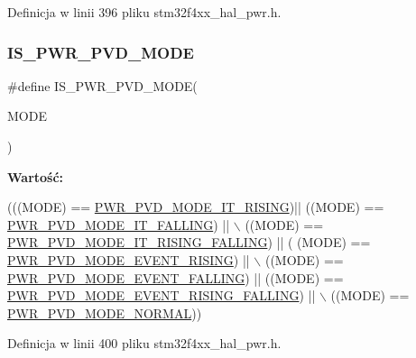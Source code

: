 Definicja w linii 396 pliku stm32f4xx\+\_\+hal\+\_\+pwr.\+h.

\mbox{\label{group___p_w_r___i_s___p_w_r___definitions_ga8edfbbba20e58a9281408c23dc6ff7ef}} 
\subsubsection{\texorpdfstring{I\+S\+\_\+\+P\+W\+R\+\_\+\+P\+V\+D\+\_\+\+M\+O\+DE}{IS\_PWR\_PVD\_MODE}}
{\footnotesize\ttfamily \#define I\+S\+\_\+\+P\+W\+R\+\_\+\+P\+V\+D\+\_\+\+M\+O\+DE(\begin{DoxyParamCaption}\item[{}]{M\+O\+DE }\end{DoxyParamCaption})}

{\bfseries Wartość\+:}
\begin{DoxyCode}
(((MODE) == \hyperlink{group___p_w_r___p_v_d___mode_ga102d7b8354419990a2a780f61cd020a6}{PWR\_PVD\_MODE\_IT\_RISING})|| ((MODE) == 
      \hyperlink{group___p_w_r___p_v_d___mode_gab600a54f3a588de836cfe4b727ab8a53}{PWR\_PVD\_MODE\_IT\_FALLING}) || \(\backslash\)
                              ((MODE) == \hyperlink{group___p_w_r___p_v_d___mode_gac531fbf14457e6595505354fad521b67}{PWR\_PVD\_MODE\_IT\_RISING\_FALLING}) || (
      (MODE) == \hyperlink{group___p_w_r___p_v_d___mode_ga1a946b01887aa886de329a92c3ab0dd4}{PWR\_PVD\_MODE\_EVENT\_RISING}) || \(\backslash\)
                              ((MODE) == \hyperlink{group___p_w_r___p_v_d___mode_gaaedbe45f1a1ea6c30af6ac51abae0cae}{PWR\_PVD\_MODE\_EVENT\_FALLING}) || ((MODE) 
      == \hyperlink{group___p_w_r___p_v_d___mode_ga7455387c8e9049f9f66b46423d4f4091}{PWR\_PVD\_MODE\_EVENT\_RISING\_FALLING}) || \(\backslash\)
                              ((MODE) == \hyperlink{group___p_w_r___p_v_d___mode_ga3a4bf701a36a14a4edf4dc5a28153277}{PWR\_PVD\_MODE\_NORMAL}))
\end{DoxyCode}


Definicja w linii 400 pliku stm32f4xx\+\_\+hal\+\_\+pwr.\+h.

\mbox{\label{group___p_w_r___i_s___p_w_r___definitions_ga03c105070272141c0bab5f2b74469072}} 
